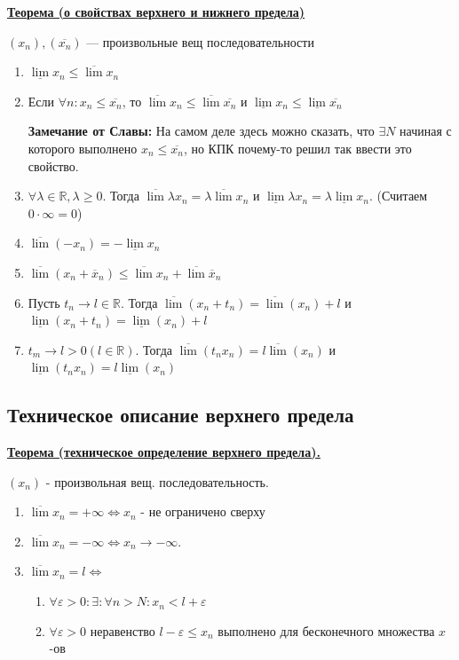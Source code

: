 \documentclass{article}
\newcommand{\R}{\mathbb{R}}
\newcommand{\thmm}[1]{\underline{\textbf{#1}}}
\begin{document}
\thmm{Теорема (о свойствах верхнего и нижнего предела)}

$(x_n), (\overline{x_n})$ --- произвольные вещ последовательности

\begin{enumerate}
    \item $\underline{\lim}x_n \leq \overline{\lim }x_n$
    \item Если $\forall n : x_n \leq \overline{x_n}$, то $\overline{\lim} x_n\leq \overline{\lim} \overline{x_n}$ и $\underline{\lim} x_n\leq \underline{\lim} \overline{x_n}$
    
    \textbf{Замечание от Славы:} На самом деле здесь можно сказать, что $\exists N$ начиная с которого выполнено $x_n \leq \overline{x_n}$, но КПК почему-то решил так ввести это свойство.

    \item $\forall \lambda \in\mathbb{R}, \lambda\geq 0$. Тогда $\overline{\lim}\lambda x_n = \lambda \overline{\lim} x_n$ и $\underline{\lim}\lambda x_n = \lambda \underline{\lim} x_n$. (Считаем $0 \cdot \infty = 0$)
    \item $\overline{\lim}(-x_n)= - \underline{\lim}x_n$
    \item $\overline{\lim }(x_n + \overline{x}_n) \leq \overline{\lim }  {x}_n + \overline{\lim }\overline{x}_n $
    \item Пусть $t_n \rightarrow l \in \R$. Тогда $\overline{\lim}(x_n + t_n) = \overline{\lim} (x_n) + l $ и $\underline{\lim}(x_n + t_n) = \underline{\lim} (x_n) + l $
    \item $t_m \rightarrow l>0 (l\in \R)$. Тогда $\overline{\lim} (t_nx_n) =l  \overline{\lim} (x_n)$ и  $\underline{\lim} (t_nx_n) =l  \underline{\lim} (x_n)$
\end{enumerate}

\subsection{Техническое описание верхнего предела}


\thmm{Теорема (техническое определение верхнего предела).}

$(x_n)$ - произвольная вещ. последовательность.

\begin{enumerate}
    \item $\overline{\lim}x_n = + \infty \Leftrightarrow x_n$ - не ограничено сверху
    \item $\overline{\lim}x_n = - \infty \Leftrightarrow x_n \rightarrow - \infty$.
    \item $\overline{\lim}x_n = l \Leftrightarrow$
    \begin{enumerate}
        \item $\forall \varepsilon >0: \exists :\forall n>N: x_n<l+\varepsilon$
        \item $\forall \varepsilon >0$ неравенство $l-\varepsilon\leq x_n$ выполнено для бесконечного множества $x$-ов
    \end{enumerate}
\end{enumerate}
\end{document}
